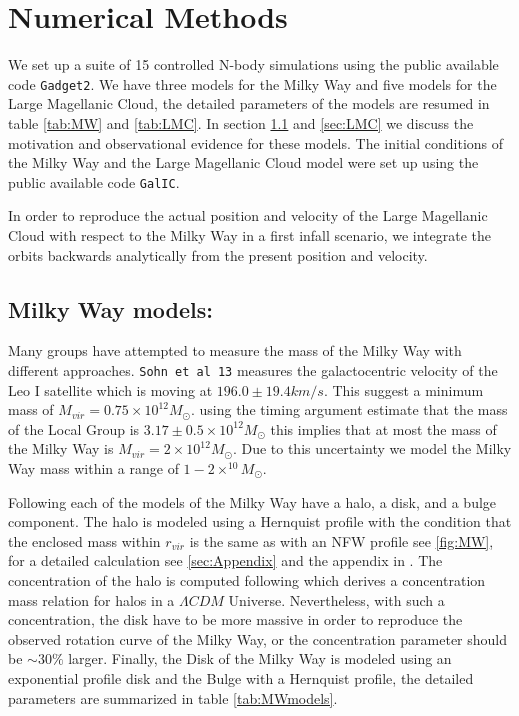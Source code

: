 \section{Numerical Methods}\label{sec:models}

We set up a suite of 15 controlled N-body simulations using the public available code
\verb+Gadget2+. We have three models for the Milky Way and five models
for the Large Magellanic Cloud, the detailed parameters of the models
are resumed in table \ref{tab:MW} and \ref{tab:LMC}. In section
\ref{sec:MW} and \ref{sec:LMC} we discuss the motivation and
observational evidence for these models. The initial conditions of the
Milky Way and the Large Magellanic Cloud model were set up using the
public available code \verb+GalIC+.

In order to reproduce the actual position and velocity of the Large
Magellanic Cloud with respect to the Milky Way in a first infall
scenario, we integrate the orbits backwards analytically from
the present position and velocity.



\subsection{Milky Way models:}\label{sec:MW}

Many groups have attempted to measure the mass of the Milky Way with
different approaches. \verb+Sohn et al 13+ measures the galactocentric
velocity of the Leo I satellite which is moving at $196.0 \pm 19.4
km/s$. This suggest a minimum mass of $M_{vir} =0.75 \times
10^{12}M_{\odot}$. \citep{vandermarel12} using the timing argument
estimate that the mass of the Local Group is $3.17\pm 0.5 \times 10^
{12}M_{\odot}$ this implies that at most the mass of the Milky Way is
$M_{vir} = 2 \times 10^{12}M_{\odot}$. Due to this uncertainty we
model the Milky Way mass within a range of $1-2 \times
^{10}M_{\odot}$.

Following \citep{Gomez15} each of the models of the Milky Way have
a halo, a disk, and a bulge component. The halo is modeled using a
Hernquist profile with the condition that the enclosed mass
within $r_{vir}$ is the same as with an NFW profile see \ref{fig:MW},
for a detailed calculation see \ref{sec:Appendix} and the appendix
in \citep{Vandermarel12}. The concentration of the halo is
computed following \citep{Klypin11} which derives a concentration
mass relation for halos in a $\Lambda CDM$
Universe. Nevertheless, with such a concentration, the disk
have to be more massive in order to reproduce the
observed rotation curve of the Milky Way, or the concentration
parameter should be $\sim 30\%$ larger. Finally, the Disk of the
Milky Way is modeled using an exponential profile disk and
the Bulge with a Hernquist profile, the detailed parameters are
summarized in table \ref{tab:MWmodels}.

